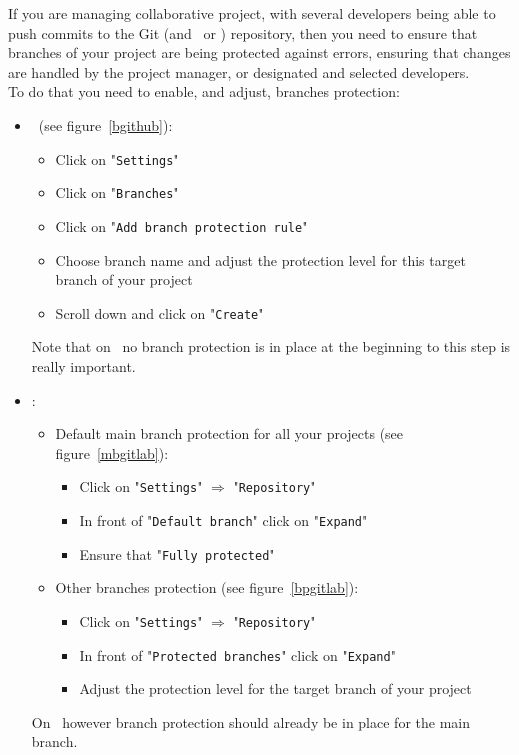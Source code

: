 If you are managing collaborative project, with several developers being able to push commits to the Git (and \github\ or \gitlab) repository, 
then you need to ensure that branches of your project are being protected against errors, ensuring that changes are handled by the project manager, or designated and selected developers. \\
To do that you need to enable, and adjust, branches protection:
\begin{itemize}
\item \github\ (see figure~\ref{bgithub}):
\begin{itemize}
\item Click on "\texttt{Settings}"
\item Click on "\texttt{Branches}"
\item Click on "\texttt{Add branch protection rule}"
\item Choose branch name and adjust the protection level for this target branch of your project
\item Scroll down and click on "\texttt{Create}"
\end{itemize}
Note that on \github\ no branch protection is in place at the beginning to this step is really important. 
\item \gitlab:
\begin{itemize}
\item Default main branch protection for all your projects (see figure~\ref{mbgitlab}):
\begin{itemize}
\item Click on "\texttt{Settings}" $\Longrightarrow$ "\texttt{Repository}"
\item In front of "\texttt{Default branch}" click on "\texttt{Expand}"
\item Ensure that "\texttt{Fully protected}" 
\end{itemize}
\item Other branches protection (see figure~\ref{bpgitlab}):
\begin{itemize}
\item Click on "\texttt{Settings}" $\Longrightarrow$ "\texttt{Repository}"
\item In front of "\texttt{Protected branches}" click on "\texttt{Expand}"
\item Adjust the protection level for the target branch of your project
\end{itemize}
\end{itemize}
On \gitlab\ however branch protection should already be in place for the main branch.
\end{itemize}

